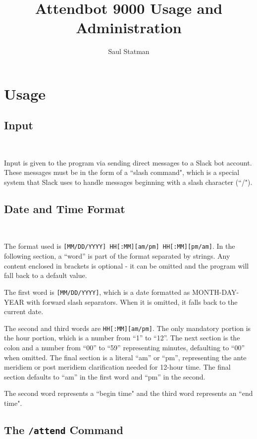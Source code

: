 \documentclass{article}
\begin{document}
\title{Attendbot 9000 Usage and Administration}

\author{Saul Statman}

\maketitle

\section{Usage}

\subsection{Input}

\

Input is given to the program via sending direct messages to a Slack bot account. These messages must be in the form of a ``slash command", which is a special system that Slack uses to handle messages beginning with a slash character (``/").

\subsection{Date and Time Format}

\

The format used is \texttt{[MM/DD/YYYY] HH[:MM][am/pm] HH[:MM][pm/am]}. In the following section, a ``word'' is part of the format separated by strings. Any content enclosed in brackets is optional - it can be omitted and the program will fall back to a default value.

The first word is \texttt{[MM/DD/YYYY]}, which is a date formatted as MONTH-DAY-YEAR with forward slash separators. When it is omitted, it falls back to the current date.

The second and third words are \texttt{HH[:MM][am/pm]}. The only mandatory portion is the hour portion, which is a number from ``1'' to ``12''. The next section is the colon and a number from ``00'' to ``59'' representing minutes, defaulting to ``00'' when omitted. The final section is a literal ``am'' or ``pm'', representing the ante meridiem or post meridiem clarification needed for 12-hour time. The final section defaults to ``am'' in the first word and ``pm'' in the second.

The second word represents a ``begin time" and the third word represents an ``end time".

\subsection{The \texttt{/attend} Command}
\end{document}

